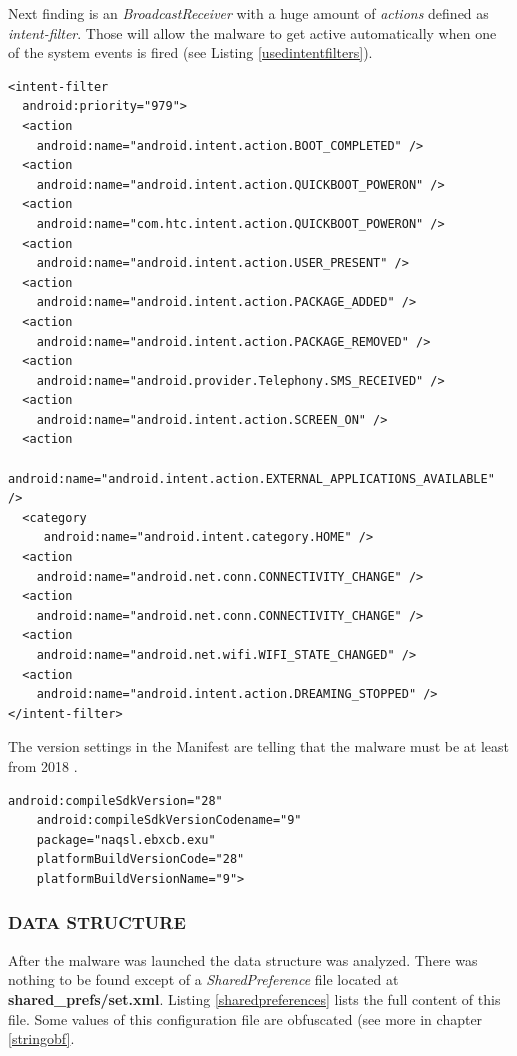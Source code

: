 \documentclass[10pt,titlepage]{article}
\begin{document}
Next finding is an \textit{BroadcastReceiver} with a huge amount of \textit{actions} defined as \textit{intent-filter}. Those will allow the malware to get active automatically when one of the system events is fired (see Listing \ref{usedintentfilters}).

\begin{lstlisting}[label=usedintentfilters,caption=Intent filter actions defined in the \textit{AndroidManifest.xml},frame=tb]
<intent-filter
  android:priority="979">
  <action
    android:name="android.intent.action.BOOT_COMPLETED" />
  <action
    android:name="android.intent.action.QUICKBOOT_POWERON" />
  <action
    android:name="com.htc.intent.action.QUICKBOOT_POWERON" />
  <action
    android:name="android.intent.action.USER_PRESENT" />
  <action
    android:name="android.intent.action.PACKAGE_ADDED" />
  <action
    android:name="android.intent.action.PACKAGE_REMOVED" />
  <action
    android:name="android.provider.Telephony.SMS_RECEIVED" />
  <action
    android:name="android.intent.action.SCREEN_ON" />
  <action
    android:name="android.intent.action.EXTERNAL_APPLICATIONS_AVAILABLE" />
  <category
     android:name="android.intent.category.HOME" />
  <action
    android:name="android.net.conn.CONNECTIVITY_CHANGE" />
  <action
    android:name="android.net.conn.CONNECTIVITY_CHANGE" />
  <action
    android:name="android.net.wifi.WIFI_STATE_CHANGED" />
  <action
    android:name="android.intent.action.DREAMING_STOPPED" />
</intent-filter>
\end{lstlisting}

The version settings in the Manifest are telling that the malware must be at least from 2018 \cite[/studio/releases/platforms]{AndroidDev}.

\begin{lstlisting}[label=versionconfiguration,caption=Sdk version configuration defined in the \textit{AndroidManifest.xml},frame=tb]
    android:compileSdkVersion="28"
    android:compileSdkVersionCodename="9"
    package="naqsl.ebxcb.exu"
    platformBuildVersionCode="28"
    platformBuildVersionName="9">
\end{lstlisting}

\subsubsection{DATA STRUCTURE} \label{datastructure}
After the malware was launched the data structure was analyzed. There was nothing to be found except of a \textit{SharedPreference} file located at \textbf{shared\_prefs/set.xml}. Listing \ref{sharedpreferences} lists the full content of this file. Some values of this configuration file are obfuscated (see more in chapter \ref{stringobf}.
\end{document}
